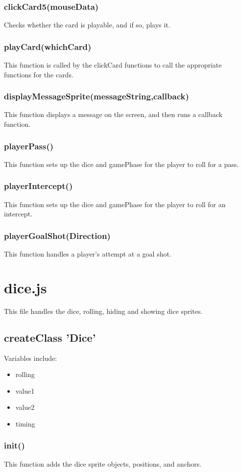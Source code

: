 \documentclass[12pt]{article}
\begin{document}
\subsubsection*{clickCard5(mouseData)}
Checks whether the card is playable, and if so, plays it. 
\subsubsection*{playCard(whichCard)}
This function is called by the clickCard functions to call the 
appropriate functions for the cards. 
\subsubsection*{displayMessageSprite(messageString,callback)}
This function displays a message on the screen, and then runs a callback
function.
\subsubsection*{playerPass()}
This function sets up the dice and gamePhase for the player to roll for a pass. 
\subsubsection*{playerIntercept()}
This function sets up the dice and gamePhase for the player to roll for an intercept. 
\subsubsection*{playerGoalShot(Direction)}
This function handles a player's attempt at a goal shot. 


\section*{dice.js}
This file handles the dice, rolling, hiding and showing dice 
sprites.  
\subsection*{createClass 'Dice'}
Variables include: 
\begin{itemize}
\item rolling 
\item value1
\item value2
\item timing
\end{itemize}

\subsubsection*{init()}
This function adds the dice sprite objects, positions, and anchors. 
\end{document}
